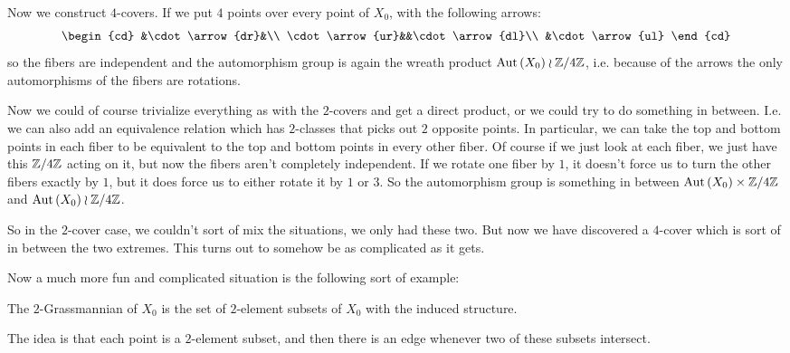 \documentclass{amsart}
\begin{document}
\begin{exm}
Now we construct $4$-covers.
If we put $4$ points over every point of $X_0$, 
with the following arrows:
\begin{equation}
\begin{cd}
&\cdot \arrow{dr}&\\
\cdot \arrow{ur}&&\cdot \arrow{dl}\\
&\cdot \arrow{ul}
\end{cd}
\label{eqn:4points}
\end{equation}
so the fibers are independent and the automorphism group is
again the wreath product $\operatorname{Aut}\left( X_0 \right) \wr \mathbb{Z} / 4\mathbb{Z}$,
i.e. because of the arrows the only automorphisms of the fibers are rotations.

Now we could of course trivialize everything as with the $2$-covers 
and get a direct product, or we could try to do something in between. 
I.e. we can also add an equivalence relation which has $2$-classes 
that picks out $2$ opposite points.
In particular, we can take the top and bottom points in each fiber to
be equivalent to the top and bottom points in every other fiber.
Of course if we just look at each fiber, we just have this $\mathbb{Z} / 4\mathbb{Z}$ acting on it,
but now the fibers aren't completely independent.
If we rotate one fiber by $1$, it doesn't force us to turn the other fibers exactly by
$1$, but it does force us to either rotate it by $1$ or $3$.
So the automorphism group is something in between $\operatorname{Aut}\left( X_0 \right)\times \mathbb{Z}/4\mathbb{Z}$
and $\operatorname{Aut}\left( X_0 \right) \wr \mathbb{Z} / 4\mathbb{Z}$.

So in the $2$-cover case, we couldn't sort of mix the situations, we only had these two.
But now we have discovered a $4$-cover which is sort of in between the two extremes.
This turns out to somehow be as complicated as it gets.
\end{exm}

Now a much more fun and complicated situation is the following sort of example:

\begin{defn}
The $2$-Grassmannian of $X_0$ is the set of $2$-element subsets of $X_0$
with the induced structure.
\end{defn}

The idea is that each point is a $2$-element subset, and then 
there is an edge whenever two of these subsets intersect.
\end{document}
